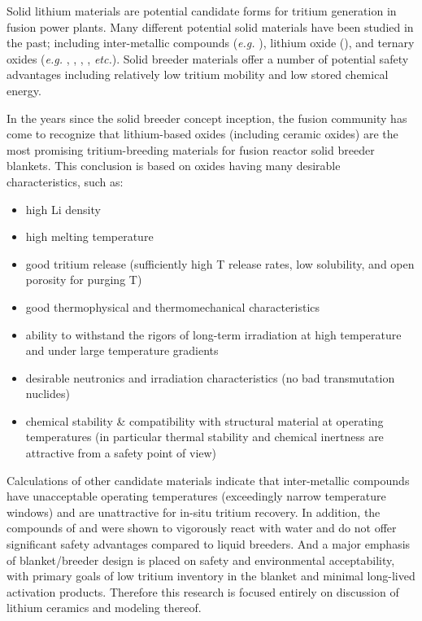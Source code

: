 
Solid lithium materials are potential candidate forms for tritium generation in fusion power plants. Many different potential solid materials have been studied in the past; including inter-metallic compounds (\textit{e.g.} ), lithium oxide (\lio), and ternary oxides (\textit{e.g.} \lis, \lit, \lial, \liz, \textit{etc.}). Solid breeder materials offer a number of potential safety advantages including relatively low tritium mobility and low stored chemical energy.

In the years since the solid breeder concept inception, the fusion community has come to recognize that lithium-based oxides (including ceramic oxides) are the most promising tritium-breeding materials for fusion reactor solid breeder blankets. This conclusion is based on oxides having many desirable characteristics, such as: 
\begin{itemize}
\item{high Li density}
\item{high melting temperature}
\item good tritium release (sufficiently high T release rates, low solubility, and open porosity for purging T)
\item good thermophysical and thermomechanical characteristics
\item ability to withstand the rigors of long-term irradiation at high temperature and under large temperature gradients
\item{desirable neutronics and irradiation characteristics (no bad transmutation nuclides)}
\item{chemical stability \& compatibility with structural material at operating temperatures (in particular thermal stability and chemical inertness are attractive from a safety point of view)}
\end{itemize}

Calculations of other candidate materials indicate that inter-metallic compounds have unacceptable operating temperatures (exceedingly narrow temperature windows) and are unattractive for in-situ tritium recovery. In addition, the compounds of  and  were shown to vigorously react with water and do not offer significant safety advantages compared to liquid breeders.\cite{Clemmer1980,Abdou1975c} And a major emphasis of blanket/breeder design is placed on safety and environmental acceptability, with primary goals of low tritium inventory in the blanket and minimal long-lived activation products. Therefore this research is focused entirely on discussion of lithium ceramics and modeling thereof.

